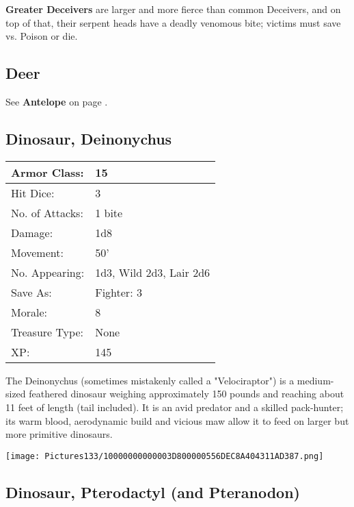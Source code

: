\documentclass[a4paper,twoside,openany,10pt]{book}
\begin{document}
\begin{multicols}{2}
\textbf{Greater Deceivers} are larger and more fierce than common Deceivers,
and on top of that, their serpent heads have a deadly venomous bite;
victims must save vs. Poison or die.

\subsection*{Deer}\label{deer}

See \textbf{Antelope} on page \hyperlink{antelope}{\pageref{antelope}}.

\subsection*{Dinosaur, Deinonychus}\label{dinosaur-deinonychus}

\begin{tabularx}{0.48\textwidth}{@{}lX@{}}
Armor Class: & 15 \\\hline
Hit Dice: & 3 \\\hline
No. of Attacks: & 1 bite \\\hline
Damage: & 1d8 \\\hline
Movement: & 50' \\\hline
No. Appearing: & 1d3, Wild 2d3, Lair 2d6 \\\hline
Save As: & Fighter: 3 \\\hline
Morale: & 8 \\\hline
Treasure Type: & None \\\hline
XP: & 145 \\\hline
\end{tabularx}\medskip

The Deinonychus (sometimes mistakenly called a "Velociraptor") is a medium-sized feathered dinosaur weighing approximately 150 pounds and reaching about 11 feet of length (tail included). It is an avid predator and a skilled pack-hunter; its warm blood, aerodynamic build and vicious maw allow it to feed on larger but more primitive dinosaurs.

\begin{center}
	\texttt{[image: Pictures133/10000000000003D800000556DEC8A404311AD387.png]}
\end{center}

\subsection*{Dinosaur, Pterodactyl (and Pteranodon)}\label{dinosaur-pterodactyl-and-pteranodon}


\end{multicols}
\end{document}
